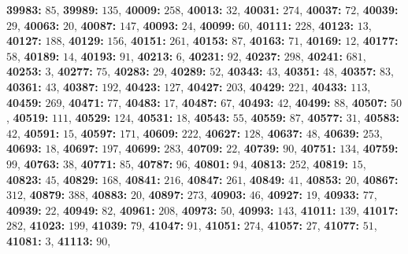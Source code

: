 \textsf{\bfseries 39983:} $85$, \textsf{\bfseries 39989:} $135$, \textsf{\bfseries 40009:} $258$, \textsf{\bfseries 40013:} $32$, \textsf{\bfseries 40031:} $274$, \textsf{\bfseries 40037:} $72$, \textsf{\bfseries 40039:} $29$, \textsf{\bfseries 40063:} $20$, \textsf{\bfseries 40087:} $147$, \textsf{\bfseries 40093:} $24$, \textsf{\bfseries 40099:} $60$, \textsf{\bfseries 40111:} $228$, \textsf{\bfseries 40123:} $13$, \textsf{\bfseries 40127:} $188$, \textsf{\bfseries 40129:} $156$, \textsf{\bfseries 40151:} $261$, \textsf{\bfseries 40153:} $87$, \textsf{\bfseries 40163:} $71$, \textsf{\bfseries 40169:} $12$, \textsf{\bfseries 40177:} $58$, \textsf{\bfseries 40189:} $14$, \textsf{\bfseries 40193:} $91$, \textsf{\bfseries 40213:} $6$, \textsf{\bfseries 40231:} $92$, \textsf{\bfseries 40237:} $298$, \textsf{\bfseries 40241:} $681$, \textsf{\bfseries 40253:} $3$, \textsf{\bfseries 40277:} $75$, \textsf{\bfseries 40283:} $29$, \textsf{\bfseries 40289:} $52$, \textsf{\bfseries 40343:} $43$, \textsf{\bfseries 40351:} $48$, \textsf{\bfseries 40357:} $83$, \textsf{\bfseries 40361:} $43$, \textsf{\bfseries 40387:} $192$, \textsf{\bfseries 40423:} $127$, \textsf{\bfseries 40427:} $203$, \textsf{\bfseries 40429:} $221$, \textsf{\bfseries 40433:} $113$, \textsf{\bfseries 40459:} $269$, \textsf{\bfseries 40471:} $77$, \textsf{\bfseries 40483:} $17$, \textsf{\bfseries 40487:} $67$, \textsf{\bfseries 40493:} $42$, \textsf{\bfseries 40499:} $88$, \textsf{\bfseries 40507:} $50$, \textsf{\bfseries 40519:} $111$, \textsf{\bfseries 40529:} $124$, \textsf{\bfseries 40531:} $18$, \textsf{\bfseries 40543:} $55$, \textsf{\bfseries 40559:} $87$, \textsf{\bfseries 40577:} $31$, \textsf{\bfseries 40583:} $42$, \textsf{\bfseries 40591:} $15$, \textsf{\bfseries 40597:} $171$, \textsf{\bfseries 40609:} $222$, \textsf{\bfseries 40627:} $128$, \textsf{\bfseries 40637:} $48$, \textsf{\bfseries 40639:} $253$, \textsf{\bfseries 40693:} $18$, \textsf{\bfseries 40697:} $197$, \textsf{\bfseries 40699:} $283$, \textsf{\bfseries 40709:} $22$, \textsf{\bfseries 40739:} $90$, \textsf{\bfseries 40751:} $134$, \textsf{\bfseries 40759:} $99$, \textsf{\bfseries 40763:} $38$, \textsf{\bfseries 40771:} $85$, \textsf{\bfseries 40787:} $96$, \textsf{\bfseries 40801:} $94$, \textsf{\bfseries 40813:} $252$, \textsf{\bfseries 40819:} $15$, \textsf{\bfseries 40823:} $45$, \textsf{\bfseries 40829:} $168$, \textsf{\bfseries 40841:} $216$, \textsf{\bfseries 40847:} $261$, \textsf{\bfseries 40849:} $41$, \textsf{\bfseries 40853:} $20$, \textsf{\bfseries 40867:} $312$, \textsf{\bfseries 40879:} $388$, \textsf{\bfseries 40883:} $20$, \textsf{\bfseries 40897:} $273$, \textsf{\bfseries 40903:} $46$, \textsf{\bfseries 40927:} $19$, \textsf{\bfseries 40933:} $77$, \textsf{\bfseries 40939:} $22$, \textsf{\bfseries 40949:} $82$, \textsf{\bfseries 40961:} $208$, \textsf{\bfseries 40973:} $50$, \textsf{\bfseries 40993:} $143$, \textsf{\bfseries 41011:} $139$, \textsf{\bfseries 41017:} $282$, \textsf{\bfseries 41023:} $199$, \textsf{\bfseries 41039:} $79$, \textsf{\bfseries 41047:} $91$, \textsf{\bfseries 41051:} $274$, \textsf{\bfseries 41057:} $27$, \textsf{\bfseries 41077:} $51$, \textsf{\bfseries 41081:} $3$, \textsf{\bfseries 41113:} $90$, 

